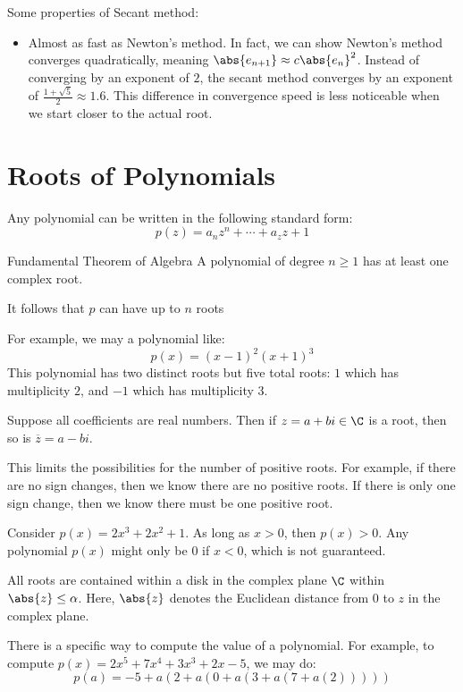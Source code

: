 Some properties of Secant method:
\begin{itemize}
    \item Almost as fast as Newton's method. In fact, we can show Newton's method converges quadratically, meaning $\abs{e_{n+1}} \approx c \abs{e_n}^2$. Instead of converging by an exponent of $2$, the secant method converges by an exponent of $\frac{1 + \sqrt{5}}{2} \approx 1.6$. This difference in convergence speed is less noticeable when we start closer to the actual root.
\end{itemize}

\section{Roots of Polynomials}

Any polynomial can be written in the following standard form:
\[ p(z) = a_n z^n + \cdots + a_z z + 1 \]

\begin{thmbox}{Fundamental Theorem of Algebra}{}
    A polynomial of degree $n \geq 1$ has at least one complex root.
\end{thmbox}

It follows that $p$ can have up to $n$ roots 

For example, we may a polynomial like:
\[ p(x) = (x-1)^2 (x+1)^3 \]
This polynomial has two distinct roots but five total roots: $1$ which has multiplicity $2$, and $-1$ which has multiplicity $3$.

Suppose all coefficients are real numbers. Then if $z = a + bi \in \C$ is a root, then so is $\overbar{z} = a - bi$.


This limits the possibilities for the number of positive roots. For example, if there are no sign changes, then we know there are no positive roots. If there is only one sign change, then we know there must be one positive root.

Consider $p(x) = 2x^3 +2x^2 + 1$. As long as $x > 0$, then $p(x) > 0$. Any polynomial $p(x)$ might only be $0$ if $x < 0$, which is not guaranteed.

All roots are contained within a disk in the complex plane $\C$ within $\abs{z} \leq \alpha$. Here, $\abs{z}$ denotes the Euclidean distance from $0$ to $z$ in the complex plane.


There is a specific way to compute the value of a polynomial. For example, to compute $p(x) = 2x^5 + 7x^4 + 3x^3 + 2x - 5$, we may do:
\[ p(a) = -5 + a(2+a(0+a(3+a(7 + a(2))))) \]

